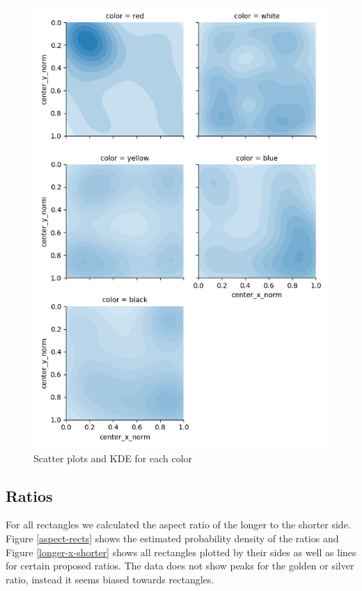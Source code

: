 \begin{figure}
  \includegraphics[width=\linewidth]{images/kernel-densities.png}
  \caption{Scatter plots and KDE for each color}
  \label{fig:kde}
\end{figure}

\subsection{Ratios} \label{ratios}

For all rectangles we calculated the aspect ratio of the longer to the shorter
side. Figure \ref{aspect-rects} shows the estimated probability density of the
ratios and Figure \ref{longer-x-shorter} shows all rectangles plotted by their
sides as well as lines for certain proposed ratios. The data does not show peaks
for the golden or silver ratio, instead it seems biased towards rectangles.

